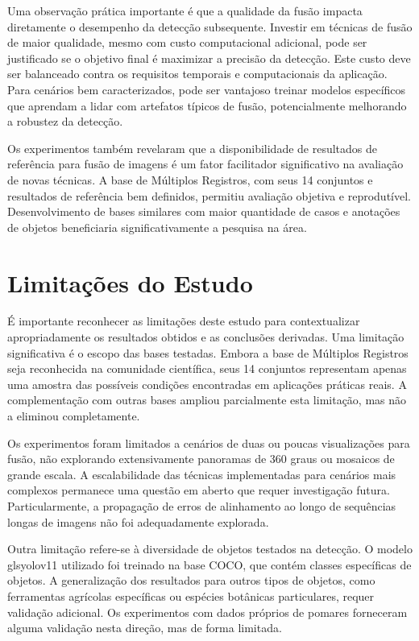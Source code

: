 Uma observação prática importante é que a qualidade da fusão impacta diretamente o desempenho da detecção subsequente. Investir em técnicas de fusão de maior qualidade, mesmo com custo computacional adicional, pode ser justificado se o objetivo final é maximizar a precisão da detecção. Este custo deve ser balanceado contra os requisitos temporais e computacionais da aplicação. Para cenários bem caracterizados, pode ser vantajoso treinar modelos específicos que aprendam a lidar com artefatos típicos de fusão, potencialmente melhorando a robustez da detecção.

Os experimentos também revelaram que a disponibilidade de resultados de referência para fusão de imagens é um fator facilitador significativo na avaliação de novas técnicas. A base de Múltiplos Registros, com seus 14 conjuntos e resultados de referência bem definidos, permitiu avaliação objetiva e reprodutível. Desenvolvimento de bases similares com maior quantidade de casos e anotações de objetos beneficiaria significativamente a pesquisa na área.

\section{Limitações do Estudo}

É importante reconhecer as limitações deste estudo para contextualizar apropriadamente os resultados obtidos e as conclusões derivadas. Uma limitação significativa é o escopo das bases testadas. Embora a base de Múltiplos Registros seja reconhecida na comunidade científica, seus 14 conjuntos representam apenas uma amostra das possíveis condições encontradas em aplicações práticas reais. A complementação com outras bases ampliou parcialmente esta limitação, mas não a eliminou completamente.

Os experimentos foram limitados a cenários de duas ou poucas visualizações para fusão, não explorando extensivamente panoramas de 360 graus ou mosaicos de grande escala. A escalabilidade das técnicas implementadas para cenários mais complexos permanece uma questão em aberto que requer investigação futura. Particularmente, a propagação de erros de alinhamento ao longo de sequências longas de imagens não foi adequadamente explorada.

Outra limitação refere-se à diversidade de objetos testados na detecção. O modelo gls{yolo}v11 utilizado foi treinado na base COCO, que contém classes específicas de objetos. A generalização dos resultados para outros tipos de objetos, como ferramentas agrícolas específicas ou espécies botânicas particulares, requer validação adicional. Os experimentos com dados próprios de pomares forneceram alguma validação nesta direção, mas de forma limitada.

